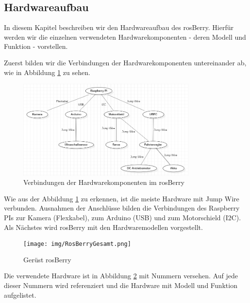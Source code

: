 \documentclass[conference]{IEEEtran}
\begin{document}
	
	\subsection{Hardwareaufbau}%
	
	In diesem Kapitel beschreiben wir den Hardwareaufbau des rosBerry. Hierfür werden wir die einzelnen verwendeten Hardwarekomponenten - deren Modell und Funktion - vorstellen.
	
	Zuerst bilden wir die Verbindungen der Hardwarekomponenten untereinander ab, wie in Abbildung \ref{Hardwarekomponenten} zu sehen.
	
	\begin{figure}[!ht]
    \centering
    \includegraphics[width=9cm]{img/Hardwarekomponenten.PNG}
    \caption{Verbindungen der Hardwarekomponenten im rosBerry}
    \label{Hardwarekomponenten}
    \end{figure}
    
    Wie aus der Abbildung \ref{Hardwarekomponenten} zu erkennen, ist die meiste Hardware mit Jump Wire verbunden. Ausnahmen der Anschlüsse bilden die Verbindungen des Raspberry PIs zur Kamera (Flexkabel), zum Arduino (USB) und zum Motorschield (I2C).\\
    
    Als Nächstes wird rosBerry mit den Hardwaremodellen vorgestellt.
    \\
    \begin{figure}[!ht]
    \centering
    \texttt{[image: img/RosBerryGesamt.png]}
    \caption{Gerüst rosBerry}
    \label{rosBerryGesamt}
    \end{figure}
    
    Die verwendete Hardware ist in Abbildung \ref{rosBerryGesamt} mit Nummern versehen. Auf jede dieser Nummern wird referenziert und die Hardware mit Modell und Funktion aufgelistet.
    
\end{document}
